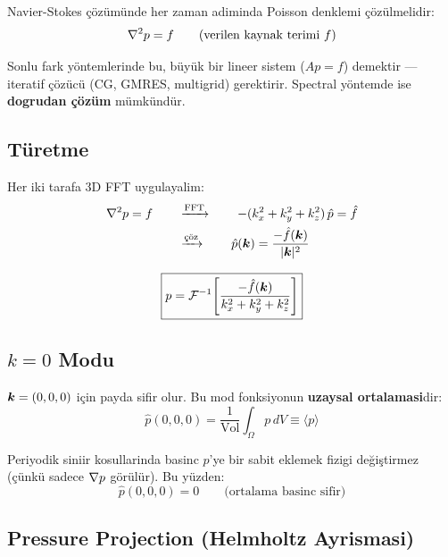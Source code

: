 Navier-Stokes çözümünde her zaman adiminda Poisson denklemi çözülmelidir:
\begin{equation}
\nabla^2 p = f \qquad\text{(verilen kaynak terimi $f$)}
\label{eq:poisson}
\end{equation}

Sonlu fark yöntemlerinde bu, büyük bir lineer sistem ($Ap = f$) demektir --- iteratif çözücü (CG, GMRES, multigrid) gerektirir. Spectral yöntemde ise \textbf{dogrudan çözüm} mümkündür.

\subsection{Türetme}

Her iki tarafa 3D FFT uygulayalim:
\begin{align}
\nabla^2 p = f \qquad &\xrightarrow{\text{FFT}} \qquad -(k_x^2 + k_y^2 + k_z^2)\,\hat{p} = \hat{f} \notag \\
&\xrightarrow{\text{çöz}} \qquad \hat{p}(\bm{k}) = \frac{-\hat{f}(\bm{k})}{|\bm{k}|^2}
\label{eq:poisson_spectral}
\end{align}

\begin{equation}
\boxed{p = \mathcal{F}^{-1}\!\left[\frac{-\hat{f}(\bm{k})}{k_x^2 + k_y^2 + k_z^2}\right]}
\label{eq:poisson_solution}
\end{equation}

\subsection{$k = 0$ Modu}

$\bm{k} = (0,0,0)$ için payda sifir olur. Bu mod fonksiyonun \textbf{uzaysal ortalamasi}dir:
\begin{equation}
\hat{p}(0,0,0) = \frac{1}{\text{Vol}}\int_\Omega p\,dV \equiv \langle p \rangle
\end{equation}

Periyodik siniir kosullarinda basinc $p$'ye bir sabit eklemek fizigi değiştirmez (çünkü sadece $\nabla p$ görülür). Bu yüzden:
\begin{equation}
\hat{p}(0,0,0) = 0 \qquad\text{(ortalama basinc sifir)}
\label{eq:mean_pressure}
\end{equation}

\subsection{Pressure Projection (Helmholtz Ayrismasi)}
\label{subsec:projection}

